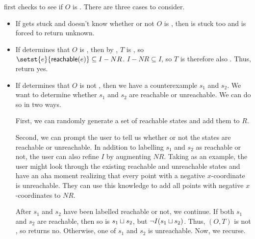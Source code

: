 \Helper{} first checks to see if $O$ is . There are three
cases to consider.
\begin{itemize}
  \item
    If \IsIclosed{} gets stuck and doesn't know whether or not $O$ is
    , then \Helper{} is stuck too and is forced to return
    unknown.
  \item
    If \IsIclosed{} determines that $O$ is , then by
    , $T$ is , so
    $\setst{e}{\reachable{e}} \subseteq I - NR$. $I - NR \subseteq I$, so $T$
    is therefore also \Iconfluent{}. Thus, \Helper{} return yes.
  \item
    If \IsIclosed{} determines that $O$ is not , then we
    have a counterexample $s_1$ and $s_2$. We want to determine whether $s_1$
    and $s_2$ are reachable or unreachable. We can do so in two ways.

    First, we can randomly generate a set of reachable states and add them to
    $R$.

    Second, we can prompt the user to tell us whether or not the states are
    reachable or unreachable. In addition to labelling $s_1$ and $s_2$ as
    reachable or not, the user can also refine $I$ by augmenting $NR$. Taking
     as an example, the user might look
    through the existing reachable and unreachable states and have an aha
    moment realizing that every point with a negative $x$-coordinate is
    unreachable. They can use this knowledge to add all points with negative
    $x$-coordinates to $NR$.

    After $s_1$ and $s_2$ have been labelled reachable or not, we continue. If
    both $s_1$ and $s_2$ are reachable, then so is $s_1 \sqcup s_2$, but $\lnot
    I(s_1 \sqcup s_2)$. Thus, $(O, T)$ is not \Iconfluent{}, so \Helper{}
    returns no.  Otherwise, one of $s_1$ and $s_2$ is unreachable. Now, we
    recurse.
\end{itemize}




